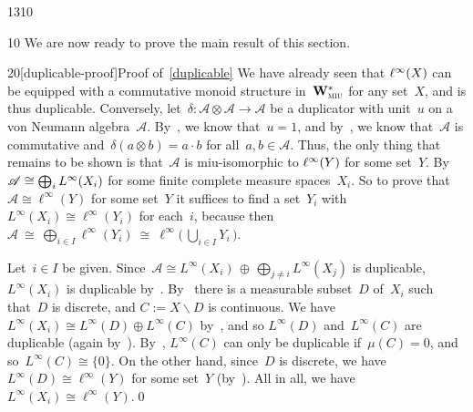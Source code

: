 \begin{parsec}{1310}%
\begin{point}{10}%
We are now ready to prove
the main result of this section.
\end{point}
\begin{point}{20}[duplicable-proof]{Proof of~\ref{duplicable}}%
We have already seen that $\ell^\infty(X)$
can be  equipped with a commutative monoid
structure in~$\mathbf{W}^*_{\text{\textsc{miu}}}$
for any set~$X$,
and is thus duplicable.
Conversely,
let~$\delta\colon \mathscr{A}\otimes\mathscr{A}\to\mathscr{A}$
be a duplicator with unit~$u$ on a von Neumann algebra~$\mathscr{A}$.
By~, we know that~$u=1$,
and by~,
we know that~$\mathscr{A}$
is commutative 
and~$\delta(a\otimes b)=a\cdot b$
for all~$a,b\in \mathscr{A}$.
Thus, the only thing that remains to be shown
is that~$\mathscr{A}$ is miu-isomorphic to $\ell^\infty(Y)$
for some set~$Y$.
By~
$\mathscr{A}\cong \bigoplus_i L^\infty(X_i)$
for some finite complete measure spaces~$X_i$.
So to prove that~$\mathscr{A}\cong \ell^\infty(Y)$
for some set~$Y$ it 
suffices
to find
 a set~$Y_i$
with $L^\infty(X_i)\cong \ell^\infty(Y_i)$
for each~$i$,
because then 
$\textstyle \mathscr{A}\ \cong \ 
\bigoplus_{i\in I} \ell^\infty(Y_i)\ \cong\ 
\ell^\infty\bigl(\,\bigcup_{i\in I} Y_i\,\bigr)$.

Let~$i\in I$ be given.
Since~$\mathscr{A}\cong L^\infty(X_i)\,\oplus\,\bigoplus_{j\neq i} 
L^\infty(X_j)$ is duplicable,
$L^\infty(X_i)$ is duplicable
by~.
By~
there is a measurable subset~$D$ of~$X_i$ such that~$D$
is discrete, and $C:=X\backslash D$ is continuous.
We have~$L^\infty(X_i)\cong L^\infty(D)\oplus L^\infty(C)$
by~\sref{lem:measure-space-partition},
and
so $L^\infty(D)$ and~$L^\infty(C)$
are duplicable
(again by~).
By~,
$L^\infty(C)$
can only be duplicable if~$\mu(C)=0$,
and so~$L^\infty(C)\cong \{0\}$.
On the other hand,
since~$D$ is discrete,
we have~$L^\infty(D)\cong \ell^\infty(Y)$
for some set~$Y$
(by~).
All in all, we have $L^\infty(X_i)\cong \ell^\infty(Y)$.\qed
\end{point}
\end{parsec}
